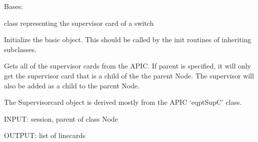 \documentclass[letterpaper,10pt,english]{sphinxmanual}
\begin{document}
\begin{fulllineitems}
\label{aciphysobject:aciphysobject.Supervisorcard}
Bases: {\hyperref[aciphysobject:aciphysobject.BaseACIPhysModule]{}}

class representing the supervisor card of a switch

Initialize the basic object.  This should be called by the
init routines of inheriting subclasses.

\begin{fulllineitems}
\label{aciphysobject:aciphysobject.Supervisorcard.get}
Gets all of the supervisor cards from the APIC.  If parent is specified, it will only get the supervisor card that is
a child of the the parent Node.  The supervisor will also be added as a child to the parent Node.

The Supervisorcard object is derived mostly from the APIC `eqptSupC' class.

INPUT: session, parent of class Node

OUTPUT: list of linecards

\end{fulllineitems}


\end{fulllineitems}

\end{document}
